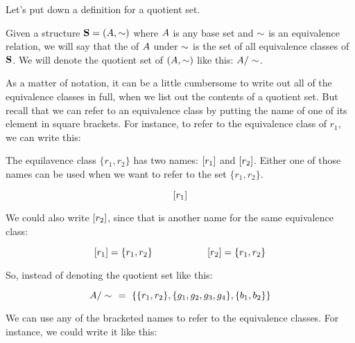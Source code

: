 \documentclass[../../../main.tex]{subfiles}
\begin{document}
Let's put down a definition for a quotient set. 

\begin{fdefinition}
  \label{def:quotient-set}
  Given a structure $\struct{S} = (\set{A}, \equivalence/)$ where $A$ is any base set and $\equivalence/$ is an equivalence relation, we will say that the  of $A$ under $\equivalence/$ is the set of all equivalence classes of $\mathbf{S}$. We will denote the quotient set of $(\set{A}, \equivalence/)$ like this: $\quotientset{\set{A}}{\equivalence/}$.
\end{fdefinition}

As a matter of notation, it can be a little cumbersome to write out all of the equivalence classes in full, when we list out the contents of a quotient set. But recall that we can refer to an equivalence class by putting the name of one of its element in square brackets. For instance, to refer to the equivalence class of $r_{1}$, we can write this: 

\begin{aside}
  \begin{notation}
    The equilavence class $\{ r_{1}, r_{2} \}$ has two names: $[r_{1}]$ and $[r_{2}]$. Either one of those names can be used when we want to refer to the set $\{ r_{1}, r_{2} \}$.
  \end{notation}
\end{aside}

\begin{equation*}
  [r_{1}]
\end{equation*}

We could also write $[r_{2}]$, since that is another name for the same equivalence class:

\begin{equation*}
  [r_{1}] = \{ r_{1}, r_{2} \} \hskip 2cm [r_{2}] = \{ r_{1}, r_{2} \}
\end{equation*}

So, instead of denoting the quotient set like this:

\begin{equation*}
  \quotientset{\set{A}}{\equivalence/}~~=~
    \{ \{ r_{1}, r_{2} \},
    \{ g_{1}, g_{2}, g_{3}, g_{4} \},
    \{ b_{1}, b_{2} \} \}
\end{equation*}

We can use any of the bracketed names to refer to the equivalence classes. For instance, we could write it like this:
\end{document}
